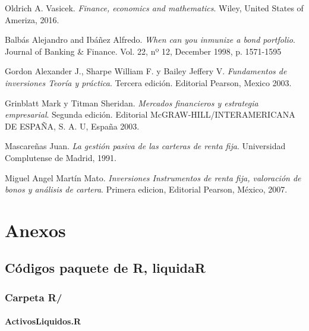 \documentclass[]{article}
\begin{document}
\begin{thebibliography}{Bibliografía}

Oldrich A. Vasicek.
\textit{Finance, economics and mathematics}.
Wiley, United States of Ameriza, 2016.

Balbás Alejandro and Ibáñez Alfredo.
\textit{When can you inmunize a bond portfolio}.
Journal of Banking \& Finance. Vol. 22, nº 12, December 1998, p. 1571-1595

Gordon Alexander J., Sharpe William F. y Bailey Jeffery V.
\textit{Fundamentos de inversiones Teoría y práctica}.
Tercera edición. Editorial Pearson, Mexico 2003.

Grinblatt Mark y Titman Sheridan.
\textit{Mercados financieros y estrategia empresarial}.
Segunda edición. Editorial McGRAW-HILL/INTERAMERICANA DE ESPAÑA, S. A. U, España 2003.

Mascareñas Juan.
\textit{La gestión pasiva de las carteras de renta fija}.
Universidad Complutense de Madrid, 1991.

Miguel Angel Martín Mato.
\textit{Inversiones Instrumentos de renta fija, valoración de bonos y análisis de cartera}.
Primera edicion, Editorial Pearson, México, 2007.

\end{thebibliography}

\hypertarget{anexos}{%
\section{Anexos}\label{anexos}}

\hypertarget{codigos-paquete-de-r-liquidar}{%
\subsection{\texorpdfstring{Códigos paquete de R,
\textbf{liquidaR}}{Códigos paquete de R, liquidaR}}\label{codigos-paquete-de-r-liquidar}}

\hypertarget{carpeta-r}{%
\subsubsection{\texorpdfstring{Carpeta
\textbf{R/}}{Carpeta R/}}\label{carpeta-r}}

\hypertarget{activosliquidos.r}{%
\paragraph{ActivosLiquidos.R}\label{activosliquidos.r}}
\end{document}
